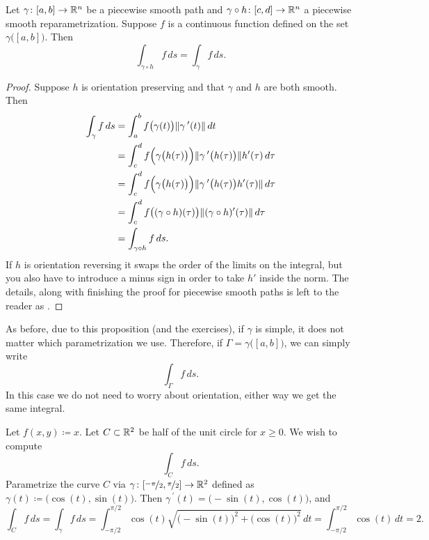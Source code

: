 \begin{prop} \label{mv:prop:lineintrepararam}
Let $\gamma \colon [a,b] \to {\mathbb{R}}^n$ be a piecewise smooth path and
$\gamma \circ h \colon [c,d] \to {\mathbb{R}}^n$ a piecewise smooth reparametrization.
Suppose $f$ is a continuous function defined on the set
$\gamma\bigl([a,b]\bigr)$.  Then
\begin{equation*}
\int_{\gamma \circ h} f\, ds = \int_{\gamma} f\, ds .
\end{equation*}
\end{prop}

\begin{proof}
Suppose $h$ is orientation preserving and that $\gamma$ and $h$
are both smooth.  Then 
\begin{equation*}
\begin{split}
\int_{\gamma} f \, ds
& =
\int_a^b 
f\bigl(\gamma(t)\bigr) \lVert {\gamma^{\:\prime}(t)} \rVert \, dt
\\
& =
\int_c^d 
f\Bigl(\gamma\bigl(h(\tau)\bigr)\Bigr)
\lVert {\gamma^{\:\prime}\bigl(h(\tau)\bigr)} \rVert h'(\tau) \, d\tau
\\
& =
\int_c^d 
f\Bigl(\gamma\bigl(h(\tau)\bigr)\Bigr)
\lVert {\gamma^{\:\prime}\bigl(h(\tau)\bigr) h'(\tau)} \rVert \, d\tau
\\
& =
\int_c^d 
f\bigl((\gamma \circ h)(\tau)\bigr) \lVert {(\gamma \circ h)'(\tau)} \rVert \, d\tau
\\
& = 
\int_{\gamma \circ h} f \, ds .
\end{split}
\end{equation*}
If $h$ is orientation reversing it swaps the order of the limits on the
integral, but you also have to introduce a minus sign in order
to take $h'$ inside the norm.
The details, along with finishing the proof for piecewise smooth
paths is left to the reader as .
\end{proof}

As before,
due to this proposition (and the exercises),
if $\gamma$ is simple, it does not matter which
parametrization we use.  Therefore, if $\Gamma = \gamma\bigl( [a,b] \bigr)$, we can
simply write
\begin{equation*}
\int_\Gamma f\, ds .
\end{equation*}
In this case we do not need to worry about orientation, either way we
get the same integral.

\begin{example}
Let $f(x,y) \coloneqq x$.  Let $C \subset {\mathbb{R}}^2$ be half of the unit circle for $x
\geq 0$.  We wish to compute
\begin{equation*}
\int_C f \, ds .
\end{equation*}
Parametrize the curve $C$ via $\gamma \colon
[\nicefrac{-\pi}{2},\nicefrac{\pi}{2}] \to {\mathbb{R}}^2$ defined as
$\gamma(t) \coloneqq \bigl(\cos(t),\sin(t)\bigr)$.
Then $\gamma^{\:\prime}(t) = \bigl(-\sin(t),\cos(t)\bigr)$, and
\begin{equation*}
\int_C f \, ds =
\int_\gamma f \, ds
=
\int_{-\pi/2}^{\pi/2} \cos(t) \sqrt{ {\bigl(-\sin(t)\bigr)}^2 +  
{\bigl(\cos(t)\bigr)}^2 } \, dt
=
\int_{-\pi/2}^{\pi/2} \cos(t) \, dt = 2.
\end{equation*}
\end{example}

